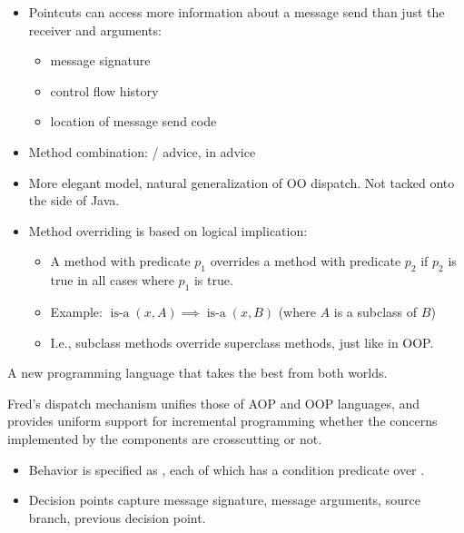 \documentclass[landscape]{slides}
\begin{document}
\begin{slide}

  \begin{itemize}
    \item Pointcuts can access more information about a message send
          than just the receiver and arguments:
    \begin{itemize}
      \item message signature
      \item control flow history
      \item location of message send code
    \end{itemize}
    \item Method combination: / advice,
           in  advice
  \end{itemize}
\end{slide}

\begin{slide}

  \begin{itemize}
    \item More elegant model, natural generalization of OO dispatch.
          Not tacked onto the side of Java.
    \item Method overriding is based on logical implication:
    \begin{itemize}    
      \item A method with predicate $p_1$ overrides a method with
            predicate $p_2$ if $p_2$ is true in all cases where $p_1$ is 
            true.
      \item Example: $\operatorname{is-a}(x,A) \implies
            \operatorname{is-a}(x,B)$ (where $A$ is a subclass of $B$)
      \item I.e., subclass methods override superclass methods, just
            like in OOP.
    \end{itemize}
  \end{itemize}
\end{slide}

\begin{slide}

  A new programming language that takes the best from both worlds.

  Fred's dispatch mechanism unifies those of AOP and OOP languages,
  and provides uniform support for incremental programming whether the
  concerns implemented by the components are crosscutting or not.

  \begin{itemize}
    \item Behavior is specified as , each of which has
          a condition predicate over .
    \item Decision points capture message signature, message
          arguments, source branch, previous decision point.
  \end{itemize}
\end{slide}
\end{document}
